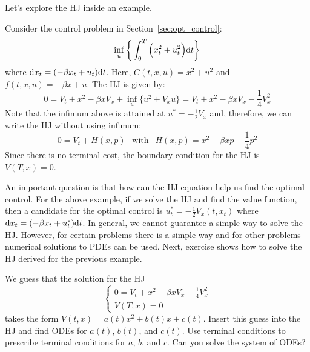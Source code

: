 \documentclass[11pt]{book}
\newcommand{\dt}{\text{\normalfont d}t}
\newcommand{\dx}{\text{\normalfont d}x}
\begin{document}
Let's explore the HJ inside an example.
\begin{eg}
    Consider the control problem in Section~\ref{sec:opt_control}:
\begin{equation}
\inf_{u}\bigg\{\int_0^T\Big(x_t^2 +u_t^2\Big) {\dt}\bigg\}
\end{equation}
where ${\dx}_t = (-\beta x_t + u_t ){\dt}$.
Here, $C(t,x,u)=x^2 + u^2$ and $f(t,x,u)=-\beta x + u$.
The HJ is given by:
\[
0 = V_t + x^2 -\beta x V_x + \inf_{u} \{u^2 + V_x u\}=V_t + x^2 -\beta x V_x -\frac14 V_x^2 
\]
Note that the infimum above is attained at $u^*=-\frac12V_x$ and, therefore, we can write the HJ without using infimum:
\[
0 = V_t + H(x,p) ~~\text{ with }~~ H(x,p)=x^2 -\beta x p -\frac14 p^2 
\]
Since there is no terminal cost, the boundary condition for the HJ is $V(T,x)=0$. 
\end{eg}
An important question is that how can the HJ equation help us find the optimal control. For the above example, if we solve the HJ and find the value function, then a candidate for the optimal control is $u_t^*=-\frac12V_x(t,x_t)$ where ${\dx}_t = (-\beta x_t + u_t^* ){\dt}$. In general, we cannot guarantee a simple way to solve the HJ. However, for certain problems there is a simple way and for other problems numerical solutions to PDEs can be used. Next, exercise shows how to solve the HJ derived for the previous example.
\begin{ex}\label{ex:lq_solution}
    We guess that the solution for the HJ
    \[
    \begin{cases}
    0 = V_t + x^2 -\beta x V_x -\frac14 V_x^2 \\
    V(T,x)=0
    \end{cases}
    \]
    takes the form $V(t,x)=a(t)x^2+b(t)x+c(t)$. Insert this guess into the HJ and find ODEs for $a(t)$, $b(t)$, and $c(t)$. Use terminal conditions to prescribe terminal conditions for $a$, $b$, and $c$. Can you solve the system of ODEs?
\end{ex}
\end{document}
